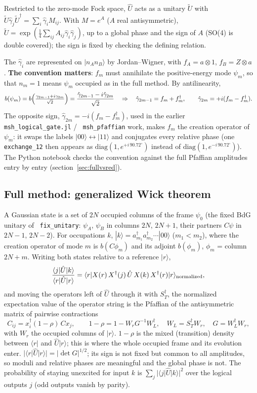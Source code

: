 \documentclass[11pt]{article}
\renewcommand{\code}[1]{\texttt{\hyphenchar\font=-1 #1}}
\newcommand{\ket}[1]{|#1\rangle}
\newcommand{\bra}[1]{\langle#1|}
\begin{document}
Restricted to the zero-mode Fock space, $\hat U$ acts as a unitary $\tilde U$ with $\tilde U\hat\gamma_j\tilde U^\dagger = \sum_i\hat\gamma_iM_{ij}$.
With $M = e^A$ ($A$ real antisymmetric), $\tilde U = \exp(\tfrac14\sum_{ij}A_{ij}\hat\gamma_i\hat\gamma_j)$, up to a global phase and the sign
of $A$ (SO(4) is double covered); the sign is fixed by checking the defining relation.

The $\hat\gamma_i$ are represented on $\ket{n_An_B}$ by Jordan--Wigner, with $f_A = a\otimes1$, $f_B = Z\otimes a$. \textbf{The convention matters}:
$f_m$ must annihilate the positive-energy mode $\psi_m$, so that $n_m = 1$ means $\psi_m$ occupied as in the full method. By antilinearity,
\[
b(\psi_m) = b\Bigl(\tfrac{\gamma_{2m-1} + i\gamma_{2m}}{\sqrt2}\Bigr) = \frac{\hat\gamma_{2m-1} - i\hat\gamma_{2m}}{\sqrt2}
\quad\Rightarrow\quad \hat\gamma_{2m-1} = f_m + f_m^\dagger,\qquad \hat\gamma_{2m} = +i(f_m - f_m^\dagger).
\]
The opposite sign, $\hat\gamma_{2m} = -i(f_m - f_m^\dagger)$, used in the earlier \code{msh\_logical\_gate.jl} / \code{msh\_pfaffian} work,
makes $f_m$ the creation operator of $\psi_m$: it swaps the labels $\ket{00}\leftrightarrow\ket{11}$ and conjugates every relative phase
(one \code{exchange\_12} then appears as $\mathrm{diag}(1, e^{+i\,90.72^\circ})$ instead of $\mathrm{diag}(1, e^{-i\,90.72^\circ})$). The Python
notebook checks the convention against the full Pfaffian amplitudes entry by entry (section~\ref{sec:fullvsred}).

\subsection{Full method: generalized Wick theorem}

A Gaussian state is a set of $2N$ occupied columns of the frame $\psi_0$ (the fixed BdG unitary of \code{fix\_unitary}: $\psi_A$, $\psi_B$ in columns
$2N$, $2N+1$, their partners $C\psi$ in $2N-1$, $2N-2$). For occupations $k$, $\ket k = a^\dagger_{m_1}a^\dagger_{m_2}\cdots\ket{00}$ ($m_1<m_2$),
where the creation operator of mode $m$ is $b(C\phi_m)$ and its adjoint $b(\phi_m)$, $\phi_m$ = column $2N+m$. Writing both states relative to a
reference $\ket r$,
\[
\frac{\bra j\hat U\ket k}{\bra r\hat U\ket r} = \bra r X(r)\,X^\dagger(j)\,\hat U\,X(k)\,X^\dagger(r)\ket r_{\rm normalized},
\]
and moving the operators left of $\hat U$ through it with $S_T^\dagger$, the normalized expectation value of the operator string is the
Pfaffian of the antisymmetric matrix of pairwise contractions
\[
C_{ij} = x_i^\dagger(1-\rho)\,Cx_j,\qquad 1-\rho = 1 - W_rG^{-1}W_L^\dagger,\quad W_L = S_T^\dagger W_r,\quad G = W_L^\dagger W_r,
\]
with $W_r$ the occupied columns of $\ket r$. $1-\rho$ is the mixed (transition) density between $\bra r$ and $\hat U\ket r$; this is where the
whole occupied frame and its evolution enter. $|\bra r\hat U\ket r| = |\det G|^{1/2}$; its sign is not fixed but common to all amplitudes,
so moduli and relative phases are meaningful and the global phase is not. The probability of staying unexcited for input $k$ is
$\sum_j|\bra j\hat U\ket k|^2$ over the logical outputs $j$ (odd outputs vanish by parity).
\end{document}

